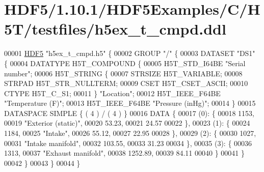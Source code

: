 \hypertarget{_h_d_f5_21_810_81_2_h_d_f5_examples_2_c_2_h5_t_2testfiles_2h5ex__t__cmpd_8ddl_source}{}\section{H\+D\+F5/1.10.1/\+H\+D\+F5\+Examples/\+C/\+H5\+T/testfiles/h5ex\+\_\+t\+\_\+cmpd.ddl}
\label{_h_d_f5_21_810_81_2_h_d_f5_examples_2_c_2_h5_t_2testfiles_2h5ex__t__cmpd_8ddl_source}

\begin{DoxyCode}
00001 \hyperlink{namespace_h_d_f5}{HDF5} \textcolor{stringliteral}{"h5ex\_t\_cmpd.h5"} \{
00002 GROUP \textcolor{stringliteral}{"/"} \{
00003    DATASET \textcolor{stringliteral}{"DS1"} \{
00004       DATATYPE  H5T\_COMPOUND \{
00005          H5T\_STD\_I64BE \textcolor{stringliteral}{"Serial number"};
00006          H5T\_STRING \{
00007             STRSIZE H5T\_VARIABLE;
00008             STRPAD H5T\_STR\_NULLTERM;
00009             CSET H5T\_CSET\_ASCII;
00010             CTYPE H5T\_C\_S1;
00011          \} \textcolor{stringliteral}{"Location"};
00012          H5T\_IEEE\_F64BE \textcolor{stringliteral}{"Temperature (F)"};
00013          H5T\_IEEE\_F64BE \textcolor{stringliteral}{"Pressure (inHg)"};
00014       \}
00015       DATASPACE  SIMPLE \{ ( 4 ) / ( 4 ) \}
00016       DATA \{
00017       (0): \{
00018             1153,
00019             \textcolor{stringliteral}{"Exterior (static)"},
00020             53.23,
00021             24.57
00022          \},
00023       (1): \{
00024             1184,
00025             \textcolor{stringliteral}{"Intake"},
00026             55.12,
00027             22.95
00028          \},
00029       (2): \{
00030             1027,
00031             \textcolor{stringliteral}{"Intake manifold"},
00032             103.55,
00033             31.23
00034          \},
00035       (3): \{
00036             1313,
00037             \textcolor{stringliteral}{"Exhaust manifold"},
00038             1252.89,
00039             84.11
00040          \}
00041       \}
00042    \}
00043 \}
00044 \}
\end{DoxyCode}
